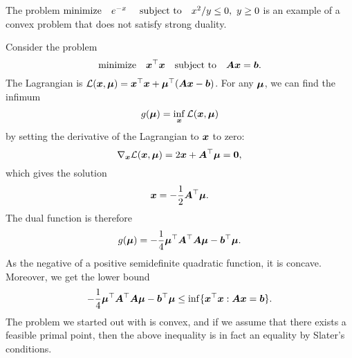 \begin{example}
 The problem $\text{minimize}\quad e^{-x} \ \quad\text{subject to}\quad x^2/y\leq 0, \ y\geq 0$ is an example of a convex problem that does not satisfy strong duality.
\end{example}

\begin{example}
 Consider the problem
 \begin{equation*}
  \text{minimize}\quad \bm{x}^{\top}\bm{x} \quad\text{subject to}\quad \bm{A}\bm{x}=\bm{b}.
 \end{equation*}
The Lagrangian is $\mathcal{L}(\bm{x},\bm{\mu})=\bm{x}^{\top}\bm{x}+\bm{\mu}^{\top}(\bm{A}\bm{x}-\bm{b})$. For any $\bm{\mu}$, we can find the infimum
\begin{equation*}
 g(\bm{\mu}) = \inf_{\bm{x}}\mathcal{L}(\bm{x},\bm{\mu})
\end{equation*}
by setting the derivative of the Lagrangian to $\bm{x}$ to zero:
\begin{equation*}
 \nabla_{\bm{x}}\mathcal{L}(\bm{x},\bm{\mu}) = 2\bm{x}+\bm{A}^{\top}\bm{\mu}=\bm{0},
\end{equation*}
which gives the solution
\begin{equation*}
 \bm{x} = -\frac{1}{2}\bm{A}^{\top}\bm{\mu}.
\end{equation*}
The dual function is therefore
\begin{equation*}
 g(\bm{\mu}) = -\frac{1}{4}\bm{\mu}^{\top}\bm{A}^{\top}\bm{A}\bm{\mu}-\bm{b}^{\top}\bm{\mu}.
\end{equation*}
As the negative of a positive semidefinite quadratic function, it is concave. Moreover, we get the lower bound
\begin{equation*}
 -\frac{1}{4}\bm{\mu}^{\top}\bm{A}^{\top}\bm{A}\bm{\mu}-\bm{b}^{\top}\bm{\mu}\leq \inf \{\bm{x}^{\top}\bm{x} \mathrel{\mathop{:}} \bm{A}\bm{x}=\bm{b}\}.
\end{equation*}
The problem we started out with is convex, and if we assume that there exists a feasible primal point, then the above inequality is in fact an equality by Slater's conditions.
\end{example}


